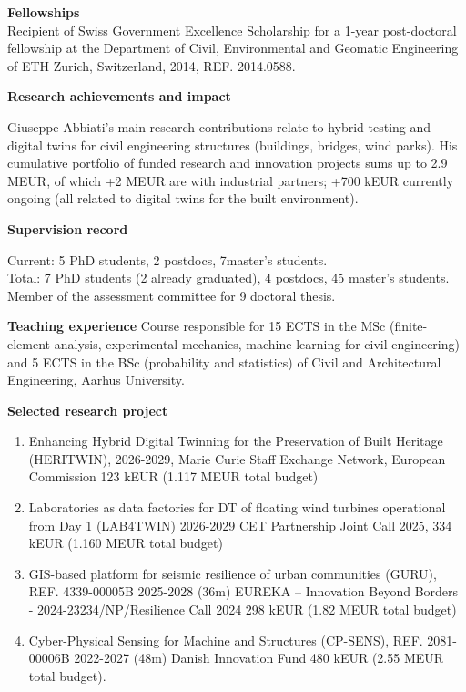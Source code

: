 \documentclass[12pt,a4paper]{article}
\begin{document}
\noindent\textbf{Fellowships}\\
Recipient of Swiss Government Excellence Scholarship for a 1-year post-doctoral fellowship at the Department of Civil, Environmental and Geomatic Engineering of ETH Zurich, Switzerland, 2014, REF. 2014.0588.

\vspace{0.2cm}
\noindent\textbf{Research achievements and impact}

\noindent Giuseppe Abbiati's main research contributions relate to hybrid testing and digital twins for civil engineering structures (buildings, bridges, wind parks). His cumulative portfolio of funded research and innovation projects sums up to 2.9 MEUR, of which +2 MEUR are with industrial partners; +700 kEUR currently ongoing (all related to digital twins for the built environment).


\vspace{0.2cm}
\noindent\textbf{Supervision record}

\noindent Current: 5 PhD students, 2 postdocs, 7master's students.\\
Total: 7 PhD students (2 already graduated), 4 postdocs, 45 master's students. \\
Member of the assessment committee for 9 doctoral thesis.

\vspace{0.2cm}
\noindent\textbf{Teaching experience}
Course responsible for 15 ECTS in the MSc (finite-element analysis, experimental mechanics, machine learning for civil engineering) and 5 ECTS in the BSc (probability and statistics) of Civil and Architectural Engineering, Aarhus University.

\vspace{0.2cm}
\noindent\textbf{Selected research project}
\begin{enumerate}[nosep]
    \item Enhancing Hybrid Digital Twinning for the Preservation of Built Heritage (HERITWIN), 2026-2029, Marie Curie Staff Exchange Network, European Commission 123 kEUR (1.117 MEUR total budget)
    \item Laboratories as data factories for DT of floating wind turbines operational from Day 1 (LAB4TWIN)	2026-2029 CET Partnership Joint Call 2025, 334 kEUR (1.160 MEUR total budget)
    \item GIS-based platform for seismic resilience of urban communities (GURU), REF. 4339-00005B
	2025-2028 (36m)	EUREKA – Innovation Beyond Borders - 2024-23234/NP/Resilience Call 2024	298 kEUR (1.82 MEUR total budget)
    \item Cyber-Physical Sensing for Machine and Structures (CP-SENS), REF. 2081-00006B	2022-2027 (48m) Danish Innovation Fund 480 kEUR (2.55 MEUR total budget).
\end{enumerate}
\end{document}
